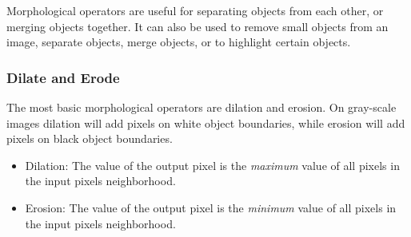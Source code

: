 Morphological operators are useful for separating objects from each other, or merging objects together. It can also be used to remove small objects from an image, separate objects, merge objects, or to highlight certain objects.


\subsubsection{Dilate and Erode}
The most basic morphological operators are dilation and erosion. On gray-scale images dilation will add pixels on white object boundaries, while erosion will add pixels on black object boundaries.
\begin{itemize}
    \item Dilation: The value of the output pixel is the \textit{maximum} value of all pixels in the input pixels neighborhood. 
    \item Erosion: The value of the output pixel is the \textit{minimum} value of all pixels in the input pixels neighborhood. \cite{website:mathworks_dilation_erosion}
\end{itemize}


